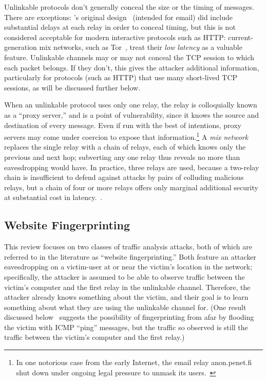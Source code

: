 \documentclass{zarticle}
\begin{document}
Unlinkable protocols don't generally conceal the size or the timing of
messages.  There are exceptions: \citeauthor{chaum1981mix}'s original
design~\cite{chaum1981mix} (intended for email) did include
substantial delays at each relay in order to conceal timing, but this
is not considered acceptable for modern interactive protocols such as
HTTP: current-generation mix networks, such as
Tor~\cite{dingledine2004tor}, treat their \emph{low latency} as a
valuable feature.  Unlinkable channels may or may not conceal the TCP
session to which each packet belongs.  If they don't, this gives the
attacker additional information, particularly for protocols (such as
HTTP) that use many short-lived TCP sessions, as will be discussed
further below.

When an unlinkable protocol uses only one relay, the relay is
colloquially known as a “proxy server,” and is a point of
vulnerability, since it knows the source and destination of every
message.  Even if run with the best of intentions, proxy servers may
come under coercion to expose that information.\footnote{In one
  notorious case from the early Internet, the email relay
  \textsf{anon.penet.fi} shut down under ongoing legal pressure to
  unmask its users.~\cite{newman1996church}} A \emph{mix
  network}~\cite{chaum1981mix} replaces the single relay with a chain
of relays, each of which knows only the previous and next hop;
subverting any one relay thus reveals no more than eavesdropping would
have.  In practice, three relays are used, because a two-relay chain
is insufficient to defend against attacks by pairs of colluding
malicious relays, but a chain of four or more relays offers only
marginal additional security at substantial cost in
latency.~\cite{wright2002analysis,wright2003defending}.

\subsection{Website Fingerprinting}

This review focuses on two classes of traffic analysis attacks, both
of which are referred to in the literature as “website
fingerprinting.”  Both feature an attacker eavesdropping on a
victim-user at or near the victim's location in the network;
specifically, the attacker is assumed to be able to observe traffic
between the victim's computer and the first relay in the unlinkable
channel.  Therefore, the attacker already knows something about the
victim, and their goal is to learn something about what they are using
the unlinkable channel for.  (One result discussed
below~\cite{gong2011remote} suggests the possibility of fingerprinting
from afar by flooding the victim with ICMP “ping” messages, but the
traffic so observed is still the traffic between the victim's computer
and the first relay.)
\end{document}
